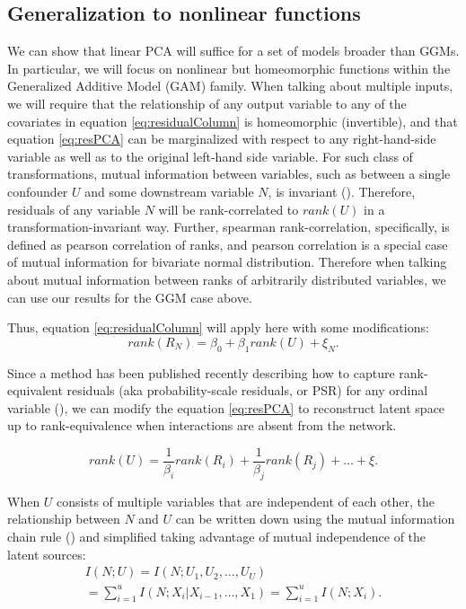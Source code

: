 \documentclass[letterpaper]{article}
\begin{document}
\subsection{Generalization to nonlinear functions}
We can show that linear PCA will suffice for a set of models broader than GGMs.  In particular, we will focus on nonlinear but homeomorphic functions within the Generalized Additive Model (GAM) family.  When talking about multiple inputs, we will require that the relationship of any output variable to any of the covariates in equation \ref{eq:residualColumn} is homeomorphic (invertible), and that equation \ref{eq:resPCA} can be marginalized with respect to any right-hand-side variable as well as to the original left-hand side variable.  For such class of transformations, mutual information between variables, such as between a single confounder $U$ and some downstream variable $N$, is invariant (\cite{kraskov_estimating_2004}).  Therefore, residuals of any variable $N$ will be rank-correlated to $rank(U)$ in a transformation-invariant way. Further, spearman rank-correlation, specifically, is defined as pearson correlation of ranks, and pearson correlation is a special case of mutual information for bivariate normal distribution.  Therefore when talking about mutual information between ranks of arbitrarily distributed variables, we can use our results for the GGM case above.

Thus, equation \ref{eq:residualColumn} will apply here with some modifications:
\begin{equation}
rank(R_N) = \beta_0 + \beta_1 rank(U) + \xi_N.
\label{eq:residualColumnRank}
\end{equation}

Since a method has been published recently describing how to capture rank-equivalent residuals (aka probability-scale residuals, or PSR) for any ordinal variable (\cite{shepherd_probability-scale_2016}), we can modify the equation \ref{eq:resPCA} to reconstruct latent space up to rank-equivalence when interactions are absent from the network.

\begin{equation}
rank(U) = \frac{1}{\beta_i} rank(R_i) + \frac{1}{\beta_j} rank(R_j) + \dots + \xi. 
\label{resPcaGam}
\end{equation}

When $U$ consists of multiple variables that are independent of each other, the relationship between $N$ and $U$ can be written down using the mutual information chain rule (\cite{mackay_information_2003}) and simplified taking advantage of mutual independence of the latent sources:
\begin{equation}
\label{eq:rankSetRelationship}
\begin{split}
I(N; U) = I(N; U_1, U_2, \dots, U_U) \\= \sum_{i=1}^{u}{I(N; X_i | X_{i-1}, \dots, X_1)} = \sum_{i=1}^{u}{I(N; X_i)}.
\end{split}
\end{equation}
\end{document}
